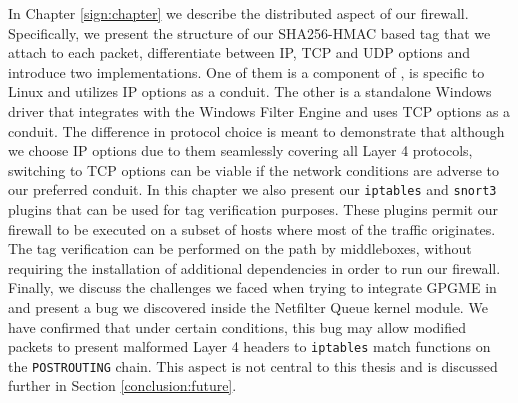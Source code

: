 In Chapter \ref{sign:chapter} we describe the distributed aspect of our firewall.
Specifically, we present the structure of our SHA256-HMAC based tag that we
attach to each packet, differentiate between IP, TCP and UDP options and
introduce two implementations. One of them is a component of \daf{}, is specific
to Linux and utilizes IP options as a conduit. The other is a standalone Windows
driver that integrates with the Windows Filter Engine and uses TCP options as
a conduit. The difference in protocol choice is meant to demonstrate that
although we choose IP options due to them seamlessly covering all Layer 4
protocols, switching to TCP options can be viable if the network conditions are
adverse to our preferred conduit. In this chapter we also present our
\texttt{iptables} and \texttt{snort3} plugins that can be used for tag
verification purposes. These plugins permit our firewall to be executed on a
subset of hosts where most of the traffic originates. The tag verification can
be performed on the path by middleboxes, without requiring the installation of
additional dependencies in order to run our firewall. Finally, we discuss the
challenges we faced when trying to integrate GPGME in \daf{} and present a bug
we discovered inside the Netfilter Queue kernel module. We have confirmed that
under certain conditions, this bug may allow modified packets to present
malformed Layer 4 headers to \texttt{iptables} match functions on the
\texttt{POSTROUTING} chain. This aspect is not central to this thesis and is
discussed further in Section \ref{conclusion:future}.
